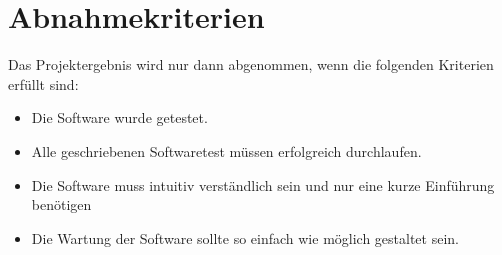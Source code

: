\chapter{Abnahmekriterien}
Das Projektergebnis wird nur dann abgenommen, wenn die folgenden Kriterien erfüllt sind:\\
\begin{itemize}
\item Die Software wurde getestet.
\item Alle geschriebenen Softwaretest müssen erfolgreich durchlaufen.
\item Die Software muss intuitiv verständlich sein und nur eine kurze Einführung benötigen
\item Die Wartung der Software sollte so einfach wie möglich gestaltet sein.
\end{itemize}
